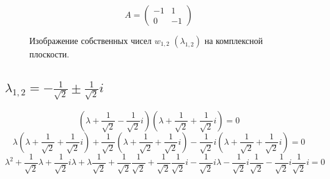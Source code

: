 \documentclass[a5paper, 10pt]{article}
\theoremstyle{definition}
\theoremstyle{plain}
\theoremstyle{remark}
\begin{document}
\begin{equation}
A =
\begin{pmatrix}
-1&1 \\
0& -1
\end{pmatrix}
\end{equation}

\begin{figure}[h!]
\caption{Изображение собственных чисел $w_{1, 2} \, \, \left( \lambda_{1, 2} \right)$ на комплексной плоскости.}
\end{figure}

\subsection{$\lambda_{1, 2} = -\frac{1}{\sqrt{2}} \pm \frac{1}{\sqrt{2}} i$}

\begin{equation}
\left( \lambda + \frac{1}{\sqrt{2}} - \frac{1}{\sqrt{2}} i \right)\left( \lambda + \frac{1}{\sqrt{2}} + \frac{1}{\sqrt{2}} i \right)=0
\end{equation}
\begin{equation}
\lambda \left( \lambda + \frac{1}{\sqrt{2}} + \frac{1}{\sqrt{2}} i \right) + \frac{1}{\sqrt{2}} \left( \lambda + \frac{1}{\sqrt{2}} + \frac{1}{\sqrt{2}} i \right) - \frac{1}{\sqrt{2}} i \left( \lambda + \frac{1}{\sqrt{2}} + \frac{1}{\sqrt{2}} i \right) =0
\end{equation}
\begin{equation}
  \lambda^2 + \frac{1}{\sqrt{2}}\lambda + \frac{1}{\sqrt{2}} i\lambda + \lambda\frac{1}{\sqrt{2}} + \frac{1}{\sqrt{2}}  \frac{1}{\sqrt{2}} + \frac{1}{\sqrt{2}} \frac{1}{\sqrt{2}} i  - \frac{1}{\sqrt{2}} i\lambda - \frac{1}{\sqrt{2}} i \frac{1}{\sqrt{2}} - \frac{1}{\sqrt{2}} i \frac{1}{\sqrt{2}} i  =0
\end{equation}
\end{document}
